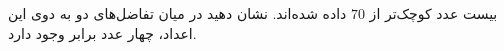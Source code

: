 \EXERCISE
بیست عدد کوچک‌تر از
$70$
داده شده‌اند. نشان دهید در میان تفاضل‌های دو به دوی این اعداد، چهار عدد برابر وجود دارد.